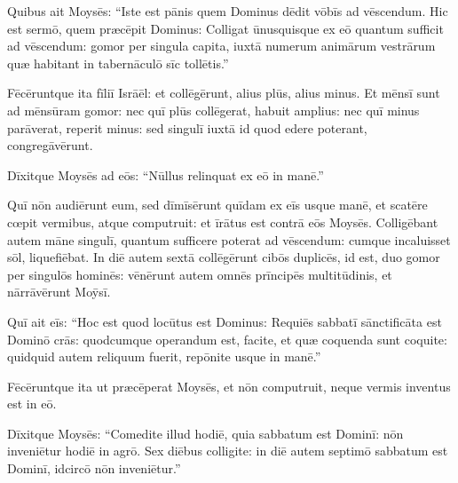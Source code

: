 Quibus ait Moysēs: ``Iste est pānis quem
Dominus dēdit vōbīs ad vēscendum. Hic est sermō, quem
præcēpit Dominus: Colligat ūnusquisque ex eō
quantum sufficit ad vēscendum: gomor per singula capita,
iuxtā numerum animārum vestrārum quæ habitant in
tabernāculō sīc tollētis.''

Fēcēruntque ita fīliī Isrāēl:
et collēgērunt, alius plūs, alius minus. Et mēnsī sunt
ad 
mēnsūram gomor: nec quī plūs collēgerat, habuit
amplius: nec quī minus parāverat, reperit minus: sed
singulī iuxtā id quod edere poterant, congregāvērunt. 

Dīxitque Moysēs ad eōs: ``Nūllus relinquat ex eō in manē.''

Quī nōn audiērunt eum, sed
dīmīsērunt quīdam ex eīs usque manē, et scatēre cœpit
vermibus, atque computruit: et īrātus est
contrā eōs Moysēs. Colligēbant autem māne singulī,
quantum sufficere poterat ad vēscendum: cumque incaluisset
sōl, liquefiēbat. In diē autem sextā collēgērunt cibōs
duplicēs, id est, duo gomor per singulōs hominēs: vēnērunt
autem omnēs prīncipēs multitūdinis, et nārrāvērunt Moȳsī. 

Quī ait eīs:
``Hoc est quod locūtus est Dominus: Requiēs sabbatī sānctificāta est Dominō crās: quodcumque operandum est, facite, et
quæ coquenda sunt coquite: quidquid autem reliquum fuerit, repōnite usque
in manē.''

Fēcēruntque ita ut præcēperat Moysēs, et nōn computruit, neque
vermis inventus est in eō.

Dīxitque Moysēs: ``Comedite
illud hodiē, quia sabbatum est Dominī: nōn inveniētur
hodiē in agrō. Sex diēbus colligite: in diē autem
septimō sabbatum est Dominī, idcircō nōn
inveniētur.''

